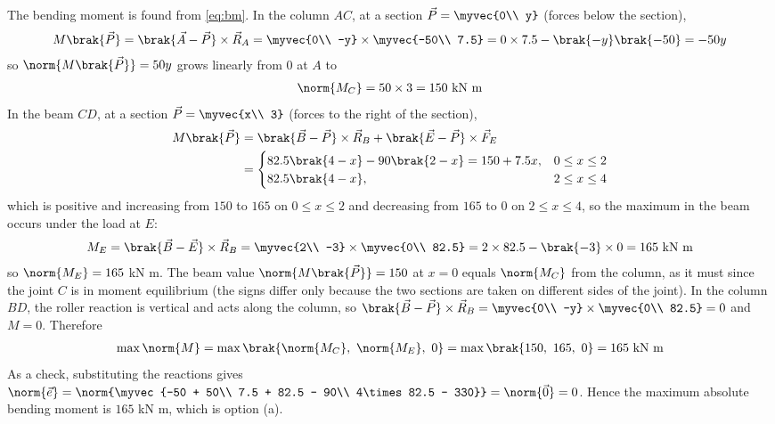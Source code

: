 \begin{enumerate}[label=\thesubsection.\arabic*, ref=\thesubsection.\theenumi, itemsep=0pt, leftmargin=*]
The bending moment is found from \eqref{eq:bm}. In the column $AC$, at a section $\vec{P} = \myvec{0\\ y}$ (forces below the section),
\begin{align}
M\brak{\vec{P}} = \brak{\vec{A} - \vec{P}}\times\vec{R}_A = \myvec{0\\ -y}\times\myvec{-50\\ 7.5} = 0\times 7.5 - \brak{-y}\brak{-50} = -50y
\end{align}
so $\norm{M\brak{\vec{P}}} = 50y$ grows linearly from $0$ at $A$ to
\begin{align}
\norm{M_C} = 50\times 3 = 150\ \text{kN m}
\end{align}
In the beam $CD$, at a section $\vec{P} = \myvec{x\\ 3}$ (forces to the right of the section),
\begin{align}
M\brak{\vec{P}} &= \brak{\vec{B} - \vec{P}}\times\vec{R}_B + \brak{\vec{E} - \vec{P}}\times\vec{F}_E\\
&= \begin{cases} 82.5\brak{4 - x} - 90\brak{2 - x} = 150 + 7.5x, & 0 \le x \le 2\\ 82.5\brak{4 - x}, & 2 \le x \le 4 \end{cases}
\end{align}
which is positive and increasing from $150$ to $165$ on $0 \le x \le 2$ and decreasing from $165$ to $0$ on $2 \le x \le 4$, so the maximum in the beam occurs under the load at $E$:
\begin{align}
M_E = \brak{\vec{B} - \vec{E}}\times\vec{R}_B = \myvec{2\\ -3}\times\myvec{0\\ 82.5} = 2\times 82.5 - \brak{-3}\times 0 = 165\ \text{kN m}
\end{align}
so $\norm{M_E} = 165$ kN m. The beam value $\norm{M\brak{\vec{P}}} = 150$ at $x = 0$ equals $\norm{M_C}$ from the column, as it must since the joint $C$ is in moment equilibrium (the signs differ only because the two sections are taken on different sides of the joint).
In the column $BD$, the roller reaction is vertical and acts along the column, so $\brak{\vec{B} - \vec{P}}\times\vec{R}_B = \myvec{0\\ -y}\times\myvec{0\\ 82.5} = 0$ and $M = 0$. Therefore
\begin{align}
\max\norm{M} = \max\brak{\norm{M_C},\ \norm{M_E},\ 0} = \max\brak{150,\ 165,\ 0} = 165\ \text{kN m}
\end{align}
As a check, substituting the reactions gives $\norm{\vec{e}} = \norm{\myvec{-50 + 50\\ 7.5 + 82.5 - 90\\ 4\times 82.5 - 330}} = \norm{\vec{0}} = 0$. Hence the maximum absolute bending moment is $165$ kN m, which is option (a).


\end{enumerate}
